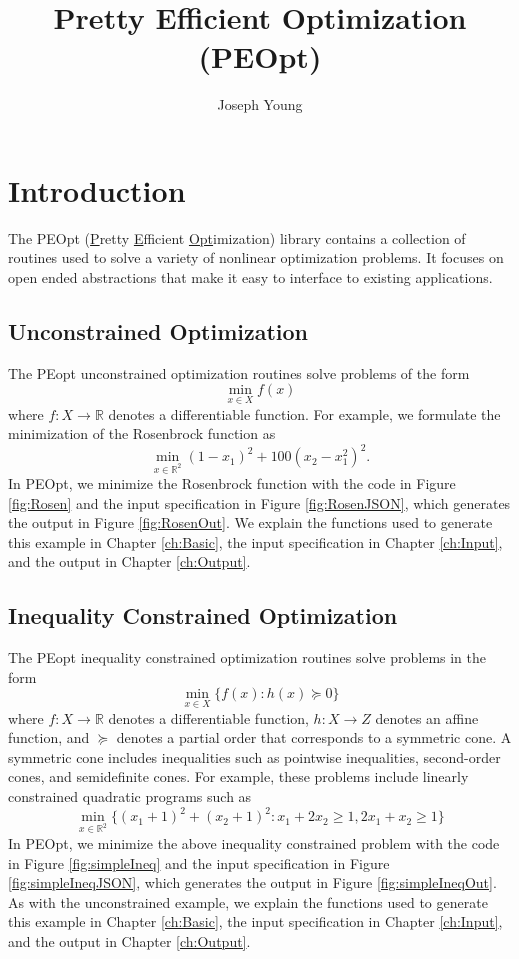 \documentclass{report}
\title{Pretty Efficient Optimization (PEOpt)}
\author{Joseph Young}
\newcommand{\re}{\mathbb{R}}
\begin{document}
\maketitle
\tableofcontents

\chapter{Introduction}

        The PEOpt (\underline{P}retty \underline{E}fficient \underline{Opt}imization) library contains a collection of routines used to solve a variety of nonlinear optimization problems.  It focuses on open ended abstractions that make it easy to interface to existing applications.

\section{Unconstrained Optimization}\setcounter{figure}{1}

        The PEopt unconstrained optimization routines solve problems of the form
$$
        \min_{x\in X} f(x)
$$
where $f:X\rightarrow \re$ denotes a differentiable function.  For example, we formulate the minimization of the Rosenbrock function as
$$
        \min_{x\in\re^2} (1-x_1)^2+100(x_2-x_1^2)^2.
$$
In PEOpt, we minimize the Rosenbrock function with the code in Figure \ref{fig:Rosen} and the input specification in Figure \ref{fig:RosenJSON}, which generates the output in Figure \ref{fig:RosenOut}.  We explain the functions used to generate this example in Chapter \ref{ch:Basic}, the input specification in Chapter \ref{ch:Input}, and the output in Chapter \ref{ch:Output}.





\section{Inequality Constrained Optimization}\setcounter{figure}{2}

        The PEopt inequality constrained optimization routines solve problems in the form
$$
        \min_{x\in X} \{ f(x) : h(x)\succeq 0\}
$$
where $f:X\rightarrow \re$ denotes a differentiable function, $h:X\rightarrow Z$ denotes an affine function, and $\succeq$ denotes a partial order that corresponds to a symmetric cone.  A symmetric cone includes inequalities such as pointwise inequalities, second-order cones, and semidefinite cones.  For example, these problems include linearly constrained quadratic programs such as
$$
        \min_{x\in\re^2}\{(x_1+1)^2+(x_2+1)^2 : x_1 + 2x_2 \geq 1, 2x_1 + x_2\geq 1\}
$$
In PEOpt, we minimize the above inequality constrained problem with the code in Figure \ref{fig:simpleIneq} and the input specification in Figure \ref{fig:simpleIneqJSON}, which generates the output in Figure \ref{fig:simpleIneqOut}.  As with the unconstrained example, we explain the functions used to generate this example in Chapter \ref{ch:Basic}, the input specification in Chapter \ref{ch:Input}, and the output in Chapter \ref{ch:Output}.
\end{document}
